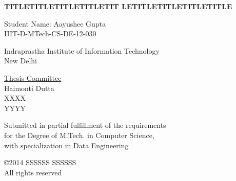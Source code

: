 

\def\addrone{Your address}
\def\addrtwo{Your city}

\def\degree{M.Tech. in Computer Science with Specialization in Data Engineering}


\def\submissiondate{April 01, 2014}

\def\supervisorone{Haimonti Dutta}

\def\supervisortwo{XXXX}

\def\supervisorthree{YYYY}





\thispagestyle{empty}

\begin{center}

{\LARGE \bf {TITLETITLETITLETITLETIT LETITLETITLETITLETITLE }

 }  
 \vspace{.3in}
 
 {\Large{Student Name: Aayushee Gupta}} \\  
 \vspace{.1in} 
 IIIT-D-MTech-CS-DE-12-030 \\

  
    \vspace{.35in}

  \vspace{.25in}

{Indraprastha Institute of Information Technology\\
New Delhi}

\vspace{.35in}  {\underline{Thesis Committee} \\ \supervisorone         
   \\ \supervisortwo \\ \supervisorthree }\\ \vspace{.35in}


 {Submitted in partial fulfillment of the requirements \\for the Degree of M.Tech. in Computer Science, \\ with specialization in Data Engineering}

\vspace{.2in}

\copyright 2014 SSSSSS SSSSSS \\ All rights reserved \\
\vspace{.8in}


\end{center}
